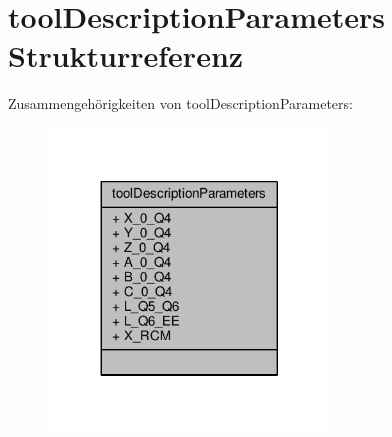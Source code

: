 \hypertarget{structtoolDescriptionParameters}{\section{tool\-Description\-Parameters Strukturreferenz}
\label{structtoolDescriptionParameters}
}


Zusammengehörigkeiten von tool\-Description\-Parameters\-:
\nopagebreak
\begin{figure}[H]
\begin{center}
\leavevmode
\includegraphics[width=212pt]{structtoolDescriptionParameters__coll__graph}
\end{center}
\end{figure}
